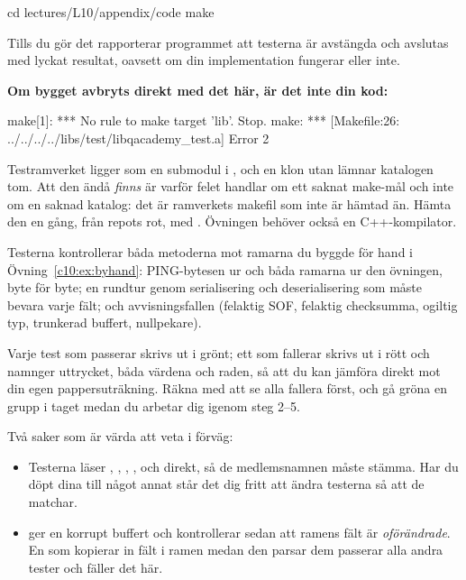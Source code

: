 \begin{shell}
cd lectures/L10/appendix/code
make
\end{shell}

Tills du gör det rapporterar programmet att testerna är avstängda och avslutas med lyckat resultat,
oavsett om din implementation fungerar eller inte.

\begin{aside}
\textbf{Om bygget avbryts direkt med det här, är det inte din kod:}

\begin{console}
make[1]: *** No rule to make target 'lib'.  Stop.
make: *** [Makefile:26: ../../../../libs/test/libqacademy_test.a] Error 2
\end{console}

Testramverket ligger som en submodul i , och en klon utan
 lämnar katalogen tom. Att den ändå \emph{finns} är varför felet handlar
om ett saknat make-mål och inte om en saknad katalog: det är ramverkets makefil som inte är hämtad
än. Hämta den en gång, från repots rot, med . Övningen behöver
också en C++-kompilator.
\end{aside}

Testerna kontrollerar båda metoderna mot ramarna du byggde för hand i Övning~\ref{c10:ex:byhand}:
PING-bytesen ur  och båda ramarna ur den övningen, byte för byte; en rundtur
genom serialisering och deserialisering som måste bevara varje fält; och avvisningsfallen (felaktig
SOF, felaktig checksumma, ogiltig typ, trunkerad buffert, nullpekare).

Varje test som passerar skrivs ut i grönt; ett som fallerar skrivs ut i rött och namnger uttrycket,
båda värdena och raden, så att du kan jämföra direkt mot din egen pappersuträkning. Räkna med att se
alla fallera först, och gå gröna en grupp i taget medan du arbetar dig igenom steg 2--5.

Två saker som är värda att veta i förväg:
\begin{itemize}
  \item Testerna läser , , , ,
     och  direkt, så de medlemsnamnen måste stämma. Har du döpt dina
    till något annat står det dig fritt att ändra testerna så att de matchar.
  \item {} ger  en korrupt buffert
    och kontrollerar sedan att ramens fält är \emph{oförändrade}. En  som
    kopierar in fält i ramen medan den parsar dem passerar alla andra tester och fäller det här.
\end{itemize}


